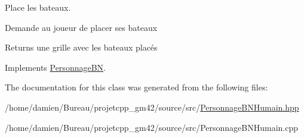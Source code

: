 Place les bateaux. 

Demande au joueur de placer ses bateaux \begin{DoxyReturn}{Returns}
une grille avec les bateaux placés 
\end{DoxyReturn}


Implements \hyperlink{classPersonnageBN_a72b5b94a8e06f39c608c7310d4785579}{Personnage\-B\-N}.



The documentation for this class was generated from the following files\-:\begin{DoxyCompactItemize}
\item 
/home/damien/\-Bureau/projetcpp\-\_\-gm42/source/src/\hyperlink{PersonnageBNHumain_8hpp}{Personnage\-B\-N\-Humain.\-hpp}\item 
/home/damien/\-Bureau/projetcpp\-\_\-gm42/source/src/Personnage\-B\-N\-Humain.\-cpp\end{DoxyCompactItemize}
